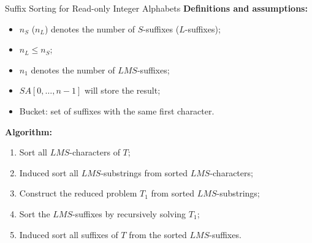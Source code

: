 \documentclass{beamer}
\begin{document}
  \begin{frame}{Suffix Sorting for Read-only Integer Alphabets}
    \textbf{Definitions and assumptions:}
    \begin{itemize}
      \item $n_S$ ($n_L$) denotes the number of $S$-suffixes ($L$-suffixes);
      \item $n_L \le n_S$;
      \item $n_1$ denotes the number of $LMS$-suffixes;
      \item $SA[0, \dots, n-1]$ will store the result;
      \item Bucket: set of suffixes with the same first character.

    \end{itemize}
    \pause

    \textbf{Algorithm:}
    \begin{enumerate}
      \item Sort all $LMS$-characters of $T$;
      \item Induced sort all $LMS$-substrings from sorted $LMS$-characters;
      \item Construct the reduced problem $T_1$ from sorted $LMS$-substrings;
      \item Sort the $LMS$-suffixes by recursively solving $T_1$;
      \item Induced sort all suffixes of $T$ from the sorted $LMS$-suffixes.
    \end{enumerate}
  \end{frame}
\end{document}
